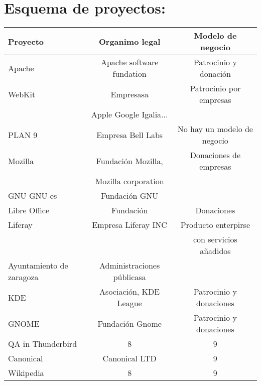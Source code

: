 \documentclass[12pt]{article} %
\begin{document}
\section{Esquema de proyectos:}
\begin{tabular}{| l | c | c | }
     \hline
     Proyecto & Organimo legal & Modelo de negocio \\ \hline
     Apache & Apache software fundation & Patrocinio y donación \\ \hline
     WebKit & Empresasa &Patrocinio por empresas \\
     &Apple Google Igalia... & \\ \hline
     PLAN 9 & Empresa Bell Labs & No hay un modelo de negocio \\ \hline
     Mozilla & Fundación Mozilla, & Donaciones de empresas \\
     & Mozilla corporation & \\ \hline
     GNU GNU-es & Fundación GNU &  \\ \hline
     Libre Office & Fundación & Donaciones \\ \hline
     Liferay & Empresa Liferay INC & Producto enterpirse\\&& con servicios añadidos \\ \hline
     Ayuntamiento de zaragoza & Administraciones públicasa &  \\ \hline
     KDE & Asociación, KDE League & Patrocinio y donaciones \\ \hline
     GNOME & Fundación Gnome & Patrocinio y donaciones \\ \hline
     QA in Thunderbird & 8 & 9 \\ \hline
     Canonical & Canonical LTD & 9 \\ \hline
     Wikipedia & 8 & 9 \\ \hline
    
   \end{tabular}

\end{document}
